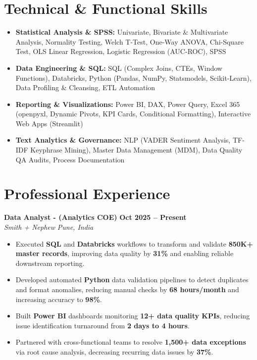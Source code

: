 \documentclass[a4paper,10pt]{article}
\begin{document}
\section{Technical \& Functional Skills}
\begin{itemize}
    \item \textbf{Statistical Analysis \& SPSS:} Univariate, Bivariate \& Multivariate Analysis, Normality Testing, Welch T-Test, One-Way ANOVA, Chi-Square Test, OLS Linear Regression, Logistic Regression (AUC-ROC), SPSS
    \item \textbf{Data Engineering \& SQL:} SQL (Complex Joins, CTEs, Window Functions), Databricks, Python (Pandas, NumPy, Statsmodels, Scikit-Learn), Data Profiling \& Cleansing, ETL Automation
    \item \textbf{Reporting \& Visualizations:} Power BI, DAX, Power Query, Excel 365 (openpyxl, Dynamic Pivots, KPI Cards, Conditional Formatting), Interactive Web Apps (Streamlit)
    \item \textbf{Text Analytics \& Governance:} NLP (VADER Sentiment Analysis, TF-IDF Keyphrase Mining), Master Data Management (MDM), Data Quality QA Audits, Process Documentation
\end{itemize}

\vspace{4pt}

\section{Professional Experience}

\textbf{Data Analyst - (Analytics COE)} \hfill \textbf{Oct 2025 -- Present} \\
\textit{Smith + Nephew} \hfill \textit{Pune, India}
\begin{itemize}
    \item Executed \textbf{SQL} and \textbf{Databricks} workflows to transform and validate \textbf{850K+ master records}, improving data quality by \textbf{31\%} and enabling reliable downstream reporting.
    \item Developed automated \textbf{Python} data validation pipelines to detect duplicates and format anomalies, reducing manual checks by \textbf{68 hours/month} and increasing accuracy to \textbf{98\%}.
    \item Built \textbf{Power BI} dashboards monitoring \textbf{12+ data quality KPIs}, reducing issue identification turnaround from \textbf{2 days to 4 hours}.
    \item Partnered with cross-functional teams to resolve \textbf{1,500+ data exceptions} via root cause analysis, decreasing recurring data issues by \textbf{37\%}.
\end{itemize}
\end{document}
